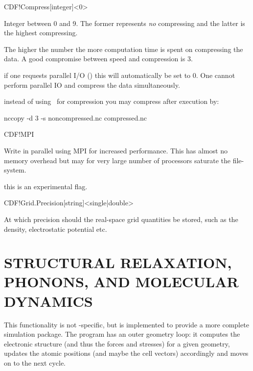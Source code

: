 \begin{fdfentry}{CDF!Compress}[integer]<$0$>

  Integer between 0 and 9. The former represents \emph{no} compressing
  and the latter is the highest compressing. 

  The higher the number the more computation time is spent on
  compressing the data. A good compromise between speed and
  compression is $3$.

  \note if one requests parallel I/O () this will
  automatically be set to $0$. One cannot perform parallel IO and
  compress the data simultaneously.

  \note instead of using \siesta\ for compression you may compress
  after execution by:
  \begin{shellexample}
    nccopy -d 3 -s noncompressed.nc compressed.nc
  \end{shellexample}
  
\end{fdfentry}


\begin{fdflogicalF}{CDF!MPI}

  Write  in parallel using MPI for increased
  performance. This has almost no memory overhead but may for very
  large number of processors saturate the file-system.

  \note this is an experimental flag.

\end{fdflogicalF}

\begin{fdfentry}{CDF!Grid.Precision}[string]<single|double>

  At which precision should the real-space grid quantities be stored,
  such as the density, electrostatic potential etc.
  
\end{fdfentry}



\vspace{5pt}
\section{STRUCTURAL RELAXATION, PHONONS, AND MOLECULAR DYNAMICS}

This functionality is not \siesta-specific, but is implemented to
provide a more complete simulation package. The program has an outer
geometry loop: it computes the electronic structure (and
thus the forces and stresses) for a given geometry, updates the
atomic positions (and maybe the cell vectors) accordingly and moves on
to the next cycle.


